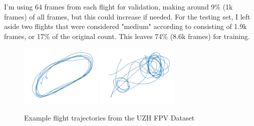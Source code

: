 \documentclass{article}
\begin{document}
I'm using 64 frames from each flight for validation, making around 9\% (1k frames) of all frames, but this could increase if needed. For the testing set, I left aside two flights that were considered "medium" according to \citep{Delmerico19icra} consisting of 1.9k frames, or 17\% of the original count. This leaves 74\% (8.6k frames) for training.
\begin{figure}
    \centering
    \includegraphics[width=0.35\textwidth]{indoor_forward_3.png}
    \includegraphics[width=0.35\textwidth]{indoor_forward_7.png}  \\
    \caption{Example flight trajectories from the UZH FPV Dataset \cite{Delmerico19icra}}
    \label{DatasetExamples}
\end{figure}



\end{document}
